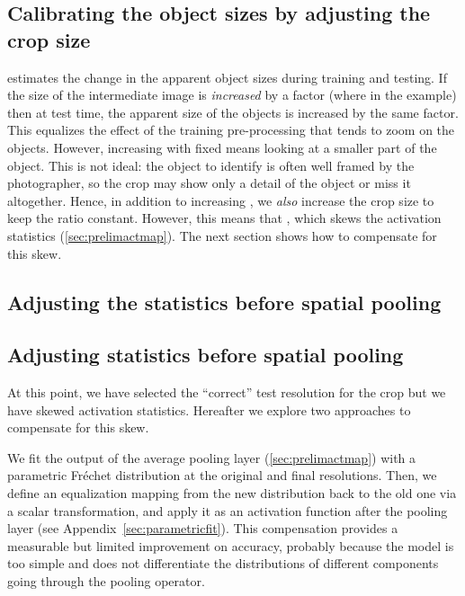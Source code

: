 \documentclass{article}
\makeatletter
\renewcommand{\paragraph}{\@startsection{paragraph}{4}{\z@}{0.4em}{-1em}{\normalfont\normalsize\bfseries}}
\makeatother
\begin{document}
\subsection{Calibrating the object sizes by adjusting the crop size}

 estimates the change in the apparent object sizes during training and testing.
If the size of the intermediate image  is \emph{increased} by a factor  (where  in the example) then
at test time, the apparent size of the objects is increased by the same factor. 
This equalizes the effect of the training pre-processing that tends to zoom on the objects.
However, increasing  with  fixed means looking at a smaller part of the object.
This is not ideal: the object to identify is often well framed by the photographer, so the crop may show only a detail of the object or miss it altogether.
Hence, in addition to increasing , we \emph{also} increase the crop size  to keep the ratio  constant. However, this means that , which skews the activation statistics (\cref{sec:prelimactmap}).
The next section shows how to compensate for this skew.




\ifnips
\subsection{Adjusting the statistics before spatial pooling}
\else
\subsection{Adjusting statistics before spatial pooling}
\fi

At this point, we have selected the ``correct'' test resolution for the crop but we have skewed activation statistics.
Hereafter we explore two approaches to compensate for this skew. 

\paragraph{Parametric adaptation.}

We fit the output of the average pooling layer (\cref{sec:prelimactmap}) with a parametric Fr\'echet distribution at the original  and final  resolutions.
Then, we define an equalization mapping from the new distribution back to the old one via a scalar transformation, and apply it as an activation function after the pooling layer (see Appendix~\ref{sec:parametricfit}).
This compensation provides a measurable but limited improvement on accuracy, probably because the model is too simple and does not differentiate the distributions of different components going through the pooling operator.
\end{document}
